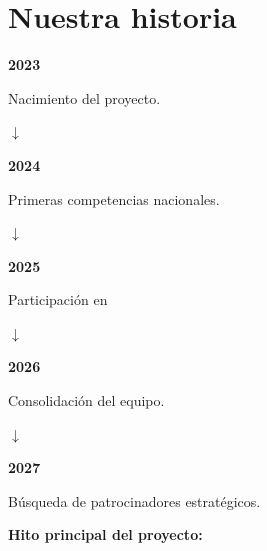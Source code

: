 \section{Nuestra historia}

\begin{minipage}[t]{0.43\textwidth}
  \textcolor{rockyred}{\Large\bfseries 2023}\par
  Nacimiento del proyecto.\par
  \vspace{4mm}\textcolor{rockymidgray}{\Large$\downarrow$}\par

  \textcolor{rockyred}{\Large\bfseries 2024}\par
  Primeras competencias nacionales.\par
  \vspace{4mm}\textcolor{rockymidgray}{\Large$\downarrow$}\par

  \textcolor{rockyred}{\Large\bfseries 2025}\par
  Participación en \dato\par
  \vspace{4mm}\textcolor{rockymidgray}{\Large$\downarrow$}\par

  \textcolor{rockyred}{\Large\bfseries 2026}\par
  Consolidación del equipo.\par
  \vspace{4mm}\textcolor{rockymidgray}{\Large$\downarrow$}\par

  \textcolor{rockyred}{\Large\bfseries 2027}\par
  Búsqueda de patrocinadores estratégicos.
\end{minipage}\hfill
\begin{minipage}[t]{0.52\textwidth}
\end{minipage}

\vfill
\textbf{Hito principal del proyecto:} \dato
\newpage
